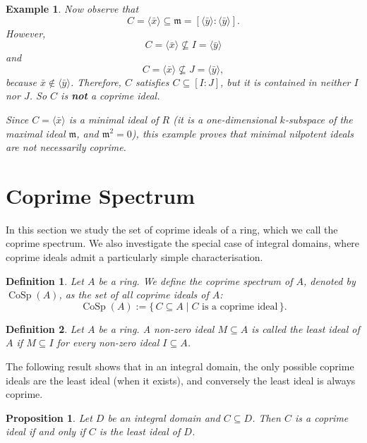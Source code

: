 \documentclass{amsart}
\newtheorem{proposition}{Proposition}
\newtheorem{definition}{Definition}
\newtheorem{example}{Example}
\begin{document}
\begin{example}
Now observe that
\[
C = \langle \bar{x} \rangle \subseteq \mathfrak{m} = [\langle \bar{y} \rangle:\langle \bar{y} \rangle].
\]
However,
\[
C = \langle \bar{x} \rangle \not\subseteq I = \langle \bar{y} \rangle
\]
and
\[
C = \langle \bar{x} \rangle \not\subseteq J = \langle \bar{y} \rangle,
\]
because $\bar{x} \notin \langle \bar{y} \rangle$. Therefore, $C$ satisfies $C \subseteq [I:J]$, but it is contained in neither $I$ nor $J$. So $C$ is \textbf{not} a coprime ideal.

Since $C = \langle \bar{x} \rangle$ is a minimal ideal of $R$ (it is a one-dimensional $k$-subspace of the maximal ideal $\mathfrak{m}$, and $\mathfrak{m}^2 = 0$), this example proves that minimal nilpotent ideals are not necessarily coprime.
\end{example}

\section{Coprime Spectrum}
\label{sec:coprime-spectrum}

In this section we study the set of coprime ideals of a ring, which we call the coprime spectrum. We also investigate the special case of integral domains, where coprime ideals admit a particularly simple characterisation.

\begin{definition}\label{def:cosp}
Let $A$ be a ring. We define the \emph{coprime spectrum} of $A$, denoted by $\operatorname{CoSp}(A)$, as the set of all coprime ideals of $A$:
\[
\operatorname{CoSp}(A) := \{\, C \subseteq A \mid C \text{ is a coprime ideal} \,\}.
\]
\end{definition}

\begin{definition}\label{def:least-ideal}
Let $A$ be a ring. A non-zero ideal $M \subseteq A$ is called the \emph{least ideal} of $A$ if $M \subseteq I$ for every non-zero ideal $I \subseteq A$.
\end{definition}

The following result shows that in an integral domain, the only possible coprime ideals are the least ideal (when it exists), and conversely the least ideal is always coprime.

\begin{proposition}\label{prop:domain-coprime-least}
Let $D$ be an integral domain and $C \subseteq D$. Then $C$ is a coprime ideal if and only if $C$ is the least ideal of $D$.
\end{proposition}
\end{document}
